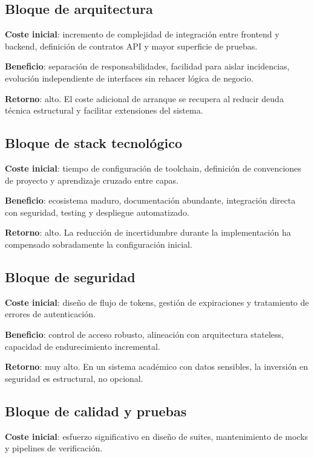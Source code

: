 \subsection{Bloque de arquitectura}

\textbf{Coste inicial}:
incremento de complejidad de integraci\'on entre frontend y backend,
definici\'on de contratos API y mayor superficie de pruebas.

\textbf{Beneficio}:
separaci\'on de responsabilidades,
facilidad para aislar incidencias,
evoluci\'on independiente de interfaces sin rehacer l\'ogica de negocio.

\textbf{Retorno}:
alto. El coste adicional de arranque se recupera
al reducir deuda t\'ecnica estructural y facilitar extensiones del sistema.

\subsection{Bloque de stack tecnol\'ogico}

\textbf{Coste inicial}:
tiempo de configuraci\'on de toolchain,
definici\'on de convenciones de proyecto y aprendizaje cruzado entre capas.

\textbf{Beneficio}:
ecosistema maduro,
documentaci\'on abundante,
integraci\'on directa con seguridad, testing y despliegue automatizado.

\textbf{Retorno}:
alto. La reducci\'on de incertidumbre durante la implementaci\'on
ha compensado sobradamente la configuraci\'on inicial.

\subsection{Bloque de seguridad}

\textbf{Coste inicial}:
dise\~no de flujo de tokens,
gesti\'on de expiraciones y tratamiento de errores de autenticaci\'on.

\textbf{Beneficio}:
control de acceso robusto,
alineaci\'on con arquitectura stateless,
capacidad de endurecimiento incremental.

\textbf{Retorno}:
muy alto. En un sistema acad\'emico con datos sensibles,
la inversi\'on en seguridad es estructural, no opcional.

\subsection{Bloque de calidad y pruebas}

\textbf{Coste inicial}:
esfuerzo significativo en dise\~no de suites,
mantenimiento de mocks y pipelines de verificaci\'on.

